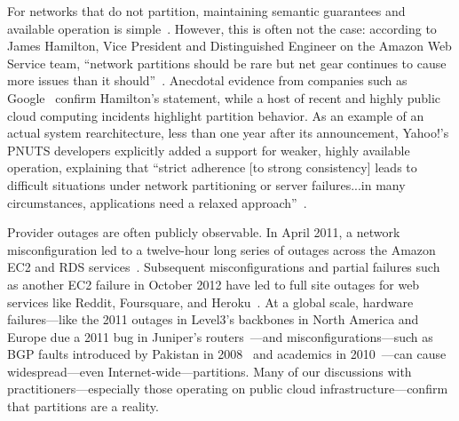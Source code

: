 For networks that do not partition, maintaining semantic guarantees
and available operation is
simple~\cite{stonebraker2010errors}. However, this is often not the
case: according to James Hamilton, Vice President and Distinguished
Engineer on the Amazon Web Service team, ``network partitions should
be rare but net gear continues to cause more issues than it
should''~\cite{hamilton-partitions}. Anecdotal evidence from companies
such as Google~\cite{dean-keynote} confirm Hamilton's statement, while
a host of recent and highly public cloud computing incidents highlight
partition behavior. As an example of an actual system rearchitecture,
less than one year after its announcement, Yahoo!'s PNUTS developers
explicitly added a support for weaker, highly available operation,
explaining that ``strict adherence [to strong consistency] leads to
difficult situations under network partitioning or server
failures...in many circumstances, applications need a relaxed
approach''~\cite{pnuts-update}.

Provider outages are often publicly observable. In April 2011, a
network misconfiguration led to a twelve-hour long series of outages
across the Amazon EC2 and RDS
services~\cite{amazon-netpartition}. Subsequent misconfigurations and
partial failures such as another EC2 failure in October 2012 have led
to full site outages for web services like Reddit, Foursquare, and
Heroku~\cite{ec2-downsites}. At a global scale, hardware
failures---like the 2011 outages in Level3's backbones in North
America and Europe due a 2011 bug in Juniper's
routers~\cite{juniper-partition}---and misconfigurations---such as BGP
faults introduced by Pakistan in 2008~\cite{pakistan-youtube} and
academics in 2010~\cite{research-experiment-partition}---can cause
widespread---even Internet-wide---partitions. Many of our discussions
with practitioners---especially those operating on public cloud
infrastructure---confirm that partitions are a reality.

